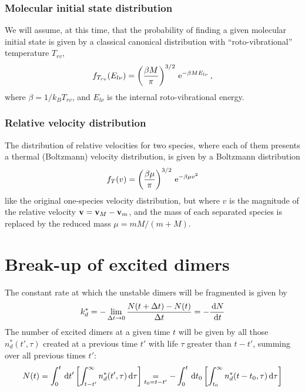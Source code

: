 \subsubsection{Molecular initial state distribution}

We will assume, at this time, that the probability of finding a given molecular initial state is given by a classical canonical distribution with ``roto-vibrational'' temperature $T_{rv}$,
\begin{equation}
  \label{Q:rates-rotovib-distrib}
  f_{T_{rv}}(E_{l\nu}) = \left( \frac{\beta M}{\pi} \right)^{3/2} \, \mathrm{e}^{- \beta M E_{l\nu}} \,,
\end{equation}
where $\beta= 1/k_{B}T_{rv}$, and $E_{l\nu}$ is the internal roto-vibrational energy.

\subsubsection{Relative velocity distribution}

The distribution of relative velocities for two species, where each of them presents a thermal (Boltzmann) velocity distribution, is given by a Boltzmann distribution
\begin{equation}
  \label{Q:rates-relat-veloc-distrib}
  f_{T}(v) = \left( \frac{\beta \mu}{\pi} \right)^{3/2} \, \mathrm{e}^{- \beta \mu v^{2}}
\end{equation}
like the original one-species velocity distribution, but where $v$ is the magnitude of the relative velocity $\mathbf{v} = \mathbf{v}_{M}- \mathbf{v}_{m}$, and the mass of each separated species is replaced by the reduced mass $\mu = m M /(m + M)$.


\section{Break-up of excited dimers}
\label{S:fragm-excit-dimers}

The constant rate at which the unstable dimers will be fragmented is given by
\begin{equation*}
  k_{d}^{*} = -\lim_{\Delta t \to 0} \frac{N(t+ \Delta t) - N(t)}{\Delta t} = -\frac{\,\mathrm{d} N}{\,\mathrm{d} t}
\end{equation*}
The number of excited dimers at a given time $t$ will be given by all those $n_{d}^{*}(t',\tau)$ created at a previous time $t'$ with life $\tau$  greater than $t-t'$, summing over all previous times $t'$:
\begin{equation}
  \label{Q:rates-number-excit-dimers}
  N(t) = \int_{0}^{t} \,\mathrm{d} t' \left[\int_{t-t'}^{\infty} n_{d}^{*}(t',\tau) \,\mathrm{d} \tau \right] \mathrel{\mathop{\kern0pt=}\limits_{t_{0}=t-t'}} -\int_{0}^{t} \,\mathrm{d} t_{0} \left[\int_{t_{0}}^{\infty} n_{d}^{*}(t-t_{0},\tau) \,\mathrm{d} \tau \right]
\end{equation}

